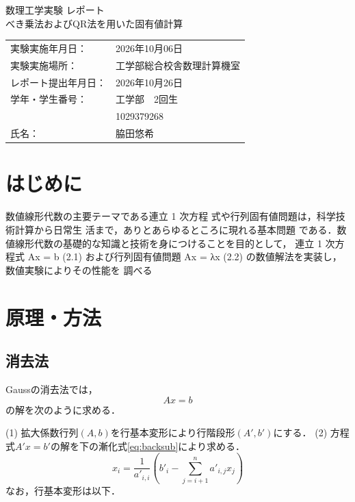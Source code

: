 \documentclass{jarticle}
\begin{document}
\begin{center}

    {\huge  数理工学実験 レポート} \\[2cm]
    {\LARGE べき乗法およびQR法を用いた固有値計算} \\[2cm]

    \begin{large}
    \begin{tabular}{ll}
        {実験実施年月日：} & 2026年10月06日 \\
        {実験実施場所：} &  工学部総合校舎数理計算機室\\
        {レポート提出年月日：} & 2026年10月26日 \\[1cm]
        学年・学生番号： & 工学部　2回生 \\
                       & 1029379268 \\
        氏名： & 脇田悠希
    \end{tabular}
    \end{large}

\end{center}

\newpage

\section{はじめに}
数値線形代数の主要テーマである連立 1 次方程
式や行列固有値問題は，科学技術計算から日常生
活まで，ありとあらゆるところに現れる基本問題
である．数値線形代数の基礎的な知識と技術を身につけることを目的として， 連立 1
次方程式
Ax = b (2.1)
および行列固有値問題
Ax = λx (2.2)
の数値解法を実装し，数値実験によりその性能を
調べる

\section{原理・方法}
\subsection{消去法}
Gaussの消去法では，
\begin{equation}
    A x = b
    \tag{2.1}
\end{equation}
の解を次のように求める．

(1) 拡大係数行列$(A,b)$を行基本変形により行階段形$(A\prime,b\prime)$にする．
(2) 方程式$A\prime x=b\prime$の解を下の漸化式\eqref{eq:backsub}により求める．
\begin{equation}
    x_i = \frac{1}{a'_{i,i}} \left( b'_i - \sum_{j=i+1}^{n} a'_{i,j} x_j \right)
    \label{eq:backsub}
\end{equation}
なお，行基本変形は以下．
\end{document}
